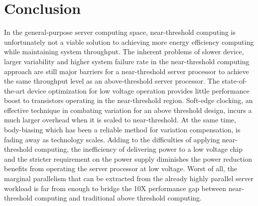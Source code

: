 \section{Conclusion}
\label{sec:conclusion}

In the general-purpose server computing space,
near-threshold computing is unfortunately not a viable solution to achieving
more energy efficiency computing while maintaining system throughput. The
inherent problems of slower device, larger variability and higher system failure
rate in the near-threshold computing approach are still major barriers for a
near-threshold server processor to achieve the same throughput level as an
above-threshold server processor. The state-of-the-art device optimization for
low voltage operation provides little performance boost to transistors operating
in the near-threshold region. Soft-edge clocking, an effective technique in
combating variation for an above threshold design, incurs a much larger overhead
when it is scaled to near-threshold. At the same time, body-biasing which has
been a reliable method for variation compensation, is fading away as technology
scales. Adding to the difficulties of applying near-threshold computing, the
inefficiency of delivering power to a low voltage chip and the stricter
requirement on the power supply diminishes the power reduction benefits from
operating the server processor at low voltage. Worst of all, the marginal
parallelism that can be extracted from the already highly parallel server
workload is far from enough to bridge the 10X performance gap between
near-threshold computing and traditional above threshold computing.         
